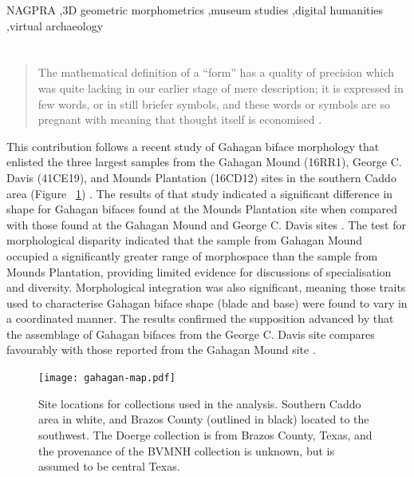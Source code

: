 \documentclass[review]{elsarticle}
\begin{document}
\begin{frontmatter}
\begin{keyword}
NAGPRA \sep 3D geometric morphometrics \sep museum studies \sep digital humanities \sep virtual archaeology
\end{keyword}

\end{frontmatter}

\linenumbers

\section*{}

\begin{quote}
The mathematical definition of a ``form'' has a quality of precision which was quite lacking in our earlier stage of mere description; it is expressed in few words, or in still briefer symbols, and these words or symbols are so pregnant with meaning that thought itself is economised \citep[720-721]{RN11532}.    
\end{quote}

This contribution follows a recent study of Gahagan biface morphology that enlisted the three largest samples from the Gahagan Mound (16RR1), George C. Davis (41CE19), and Mounds Plantation (16CD12) sites in the southern Caddo area (Figure ~\ref{fig:figmap}) \citep{RN11783}. The results of that study indicated a significant difference in shape for Gahagan bifaces found at the Mounds Plantation site when compared with those found at the Gahagan Mound and George C. Davis sites \citep[Figure 7]{RN11783}. The test for morphological disparity indicated that the sample from Gahagan Mound occupied a significantly greater range of morphospace than the sample from Mounds Plantation, providing limited evidence for discussions of specialisation and diversity. Morphological integration was also significant, meaning those traits used to characterise Gahagan biface shape (blade and base) were found to vary in a coordinated manner. The results confirmed the supposition advanced by \cite{RN3684} that the assemblage of Gahagan bifaces from the George C. Davis site compares favourably with those reported from the Gahagan Mound site \citep{RN5274,RN2740}.

\begin{figure}[ht]\centering
\texttt{[image: gahagan-map.pdf]}
\caption{Site locations for collections used in the analysis. Southern Caddo area in white, and Brazos County (outlined in black) located to the southwest. The Doerge collection is from Brazos County, Texas, and the provenance of the BVMNH collection is unknown, but is assumed to be central Texas.}
\label{fig:figmap}
\end{figure}
\end{document}
